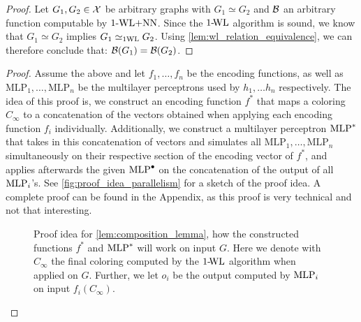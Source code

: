 \begin{proof}
    Let $G_1, G_2 \in \mathcal{X}$ be arbitrary graphs with $G_1 \simeq G_2$ and $\mathcal{B}$ an arbitrary function computable by $\text{1-WL+NN}$. Since the $\text{1-\!WL}$ algorithm is sound, we know that $G_1 \simeq G_2$ implies $G_1 \simeq_{\text{1WL}} G_2$. Using \autoref{lem:wl_relation_equivalence}, we can therefore conclude that: $\mathcal{B}(G_1) = \mathcal{B}(G_2)$.
\end{proof}

\begin{proof}
    Assume the above and let $f_{1}, \ldots, f_{n}$ be the encoding functions, as well as $\text{MLP}_1, \ldots, \text{MLP}_n$ be the multilayer perceptrons used by $h_1, \dots h_n$ respectively. The idea of this proof is, we construct an encoding function $f^*$ that maps a coloring $C_\infty$ to a concatenation of the vectors obtained when applying each encoding function $f_i$ individually. Additionally, we construct a multilayer perceptron $\text{MLP}^*$ that takes in this concatenation of vectors and simulates all $\text{MLP}_1, \ldots, \text{MLP}_n$ simultaneously on their respective section of the encoding vector of $f^*$, and applies afterwards the given $\text{MLP}^\bullet$ on the concatenation of the output of all $\text{MLP}_i$'s.  See \autoref{fig:proof_idea_parallelism} for a sketch of the proof idea. A complete proof can be found in the Appendix, as this proof is very technical and not that interesting.

    \begin{figure}[H]
        \centering
        
        \caption{Proof idea for \autoref{lem:composition_lemma}, how the constructed functions $f^*$ and $\text{MLP}^*$ will work on input $G$. Here we denote with $C_\infty$ the final coloring computed by the $\text{1-\!WL}$ algorithm when applied on $G$. Further, we let $o_i$ be the output computed by $\text{MLP}_i$ on input $f_i(C_\infty)$.}
        \label{fig:proof_idea_parallelism}
    \end{figure}
\end{proof}
    



